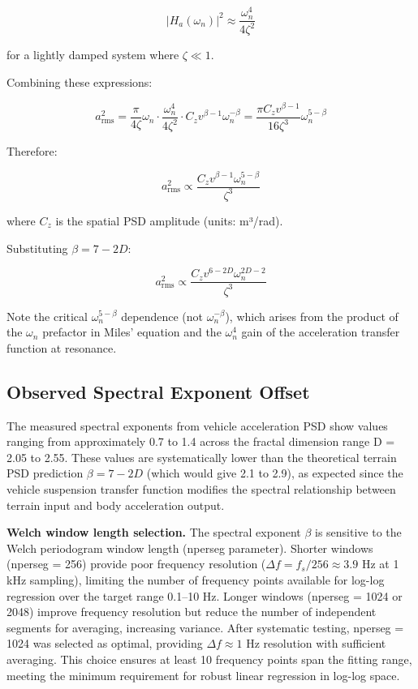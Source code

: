 \documentclass[11pt,letterpaper]{article}
\begin{document}
\begin{equation}
|H_a(\omega_n)|^2 \approx \frac{\omega_n^4}{4\zeta^2}
\end{equation}

for a lightly damped system where $\zeta \ll 1$.

Combining these expressions:

\begin{equation}
a_{\text{rms}}^2 = \frac{\pi}{4\zeta} \omega_n \cdot \frac{\omega_n^4}{4\zeta^2} \cdot C_z v^{\beta-1} \omega_n^{-\beta} = \frac{\pi C_z v^{\beta-1}}{16\zeta^3} \omega_n^{5-\beta}
\end{equation}

Therefore:

\begin{equation}
a_{\text{rms}}^2 \propto \frac{C_z v^{\beta-1} \omega_n^{5-\beta}}{\zeta^3}
\end{equation}

where $C_z$ is the spatial PSD amplitude (units: m³/rad).

Substituting $\beta = 7-2D$:

\begin{equation}
a_{\text{rms}}^2 \propto \frac{C_z v^{6-2D} \omega_n^{2D-2}}{\zeta^3}
\end{equation}

Note the critical $\omega_n^{5-\beta}$ dependence (not $\omega_n^{-\beta}$), which arises from the product of the $\omega_n$ prefactor in Miles' equation and the $\omega_n^4$ gain of the acceleration transfer function at resonance.


\subsection{Observed Spectral Exponent Offset}

The measured spectral exponents from vehicle acceleration PSD show values ranging from approximately 0.7 to 1.4 across the fractal dimension range D = 2.05 to 2.55. These values are systematically lower than the theoretical terrain PSD prediction $\beta = 7-2D$ (which would give 2.1 to 2.9), as expected since the vehicle suspension transfer function modifies the spectral relationship between terrain input and body acceleration output.

\textbf{Welch window length selection.} The spectral exponent $\beta$ is sensitive to the Welch periodogram window length (nperseg parameter). Shorter windows (nperseg = 256) provide poor frequency resolution ($\Delta f = f_s/256 \approx 3.9$ Hz at 1 kHz sampling), limiting the number of frequency points available for log-log regression over the target range 0.1--10 Hz. Longer windows (nperseg = 1024 or 2048) improve frequency resolution but reduce the number of independent segments for averaging, increasing variance. After systematic testing, nperseg = 1024 was selected as optimal, providing $\Delta f \approx 1$ Hz resolution with sufficient averaging. This choice ensures at least 10 frequency points span the fitting range, meeting the minimum requirement for robust linear regression in log-log space.
\end{document}
